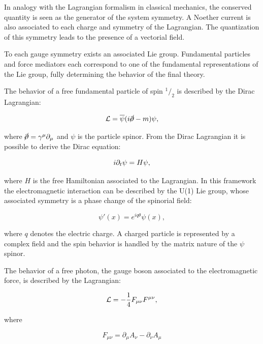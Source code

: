 In analogy with the Lagrangian formalism in classical mechanics, the conserved quantity is seen as the generator of the system symmetry. A Noether current is also associated to each charge and symmetry of the Lagrangian. The quantization of this symmetry leads to the presence of a vectorial field. 

To each gauge symmetry exists an associated Lie group. Fundamental particles and force mediators each correspond to one of the fundamental representations of the Lie group, fully determining the behavior of the final theory.

The behavior of a free fundamental particle of spin $^1/_2$ is described by the Dirac Lagrangian:

\begin{equation}
\mathcal{L}=\overline{\psi}(i\cancel{\partial}-m)\psi,
\label{eq:dirac_lag}
\end{equation}

where $\cancel{\partial} = \gamma^\mu \partial_\mu$ and $\psi$ is the particle spinor. %
From the Dirac Lagrangian it is possible to derive the Dirac equation:

\begin{equation}
i \partial_t\psi = H \psi,
\label{eq:dirac_lag}
\end{equation}

where $H$ is the free Hamiltonian associated to the Lagrangian.
In this framework the electromagnetic interaction can be described by the U(1) Lie group, whose associated symmetry is a phase change of the spinorial field: %

\begin{equation}
\psi'(x) = e^{iq\theta}\psi(x),
\end{equation}

where $q$ denotes the electric charge.
A charged particle is represented by a complex field and the spin behavior is handled by the matrix nature of the $\psi$ spinor.

The behavior of a free photon, the gauge boson associated to the electromagnetic force, is described by the Lagrangian:

\begin{equation}
\mathcal{L} = -\frac{1}{4}F_{\mu\nu}F^{\mu\nu},
\end{equation}

where

\begin{equation}
 F_{\mu\nu} =\partial_{\mu}A_{\nu}-\partial_{\nu}A_{\mu}
\end{equation}

